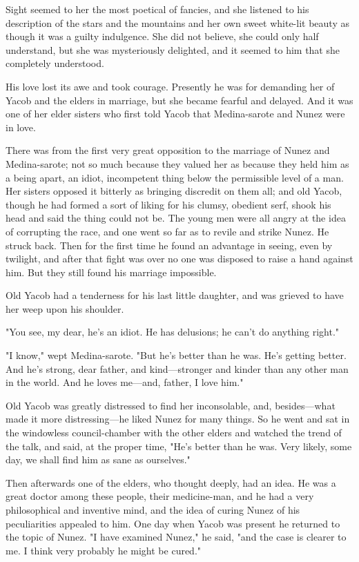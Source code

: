 \documentclass[courier]{sffms}
\begin{document}
Sight seemed to her the most poetical of fancies, and she listened to
his description of the stars and the mountains and her own sweet
white-lit beauty as though it was a guilty indulgence. She did not
believe, she could only half understand, but she was mysteriously
delighted, and it seemed to him that she completely understood.

His love lost its awe and took courage. Presently he was for demanding
her of Yacob and the elders in marriage, but she became fearful and
delayed. And it was one of her elder sisters who first told Yacob that
Medina-sarote and Nunez were in love.

There was from the first very great opposition to the marriage of
Nunez and Medina-sarote; not so much because they valued her as
because they held him as a being apart, an idiot, incompetent thing
below the permissible level of a man.  Her sisters opposed it bitterly
as bringing discredit on them all; and old Yacob, though he had formed
a sort of liking for his clumsy, obedient serf, shook his head and
said the thing could not be. The young men were all angry at the idea
of corrupting the race, and one went so far as to revile and strike
Nunez. He struck back. Then for the first time he found an advantage
in seeing, even by twilight, and after that fight was over no one was
disposed to raise a hand against him. But they still found his
marriage impossible.

Old Yacob had a tenderness for his last little daughter, and was
grieved to have her weep upon his shoulder.

"You see, my dear, he's an idiot. He has delusions; he can't do
anything right."

"I know," wept Medina-sarote. "But he's better than he was. He's
getting better.  And he's strong, dear father, and kind---stronger and
kinder than any other man in the world. And he loves me---and, father,
I love him."

Old Yacob was greatly distressed to find her inconsolable, and,
besides---what made it more distressing---he liked Nunez for many
things. So he went and sat in the windowless council-chamber with the
other elders and watched the trend of the talk, and said, at the
proper time, "He's better than he was. Very likely, some day, we shall
find him as sane as ourselves."

Then afterwards one of the elders, who thought deeply, had an idea. He
was a great doctor among these people, their medicine-man, and he had
a very philosophical and inventive mind, and the idea of curing Nunez
of his peculiarities appealed to him. One day when Yacob was present
he returned to the topic of Nunez. "I have examined Nunez," he said,
"and the case is clearer to me. I think very probably he might be
cured."
\end{document}

